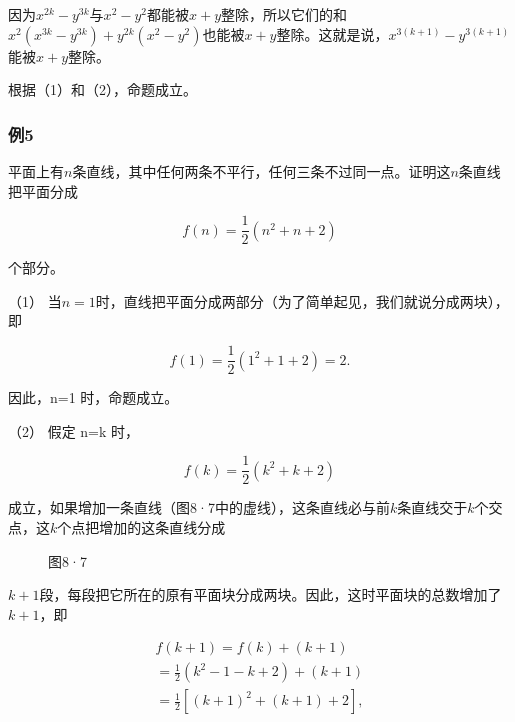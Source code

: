 因为\(x^{2k} - y^{3k}\)与\(x^2 - y^2\)都能被\(x + y\)整除，所以它们的和\(x^2(x^{3k} - y^{3k}) + y^{2k}(x^2 - y^2)\)也能被\(x + y\)整除。这就是说，\(x^{3(k + 1)} - y^{3(k + 1)}\)能被\(x + y\)整除。

根据（1）和（2），命题成立。

\subsubsection{例5}

平面上有\(n\)条直线，其中任何两条不平行，任何三条不过同一点。证明这\(n\)条直线把平面分成

\[
f (n) = \frac{1}{2} (n^{2} + n + 2)
\]

个部分。

 （1）
当\(n = 1\)时，直线把平面分成两部分（为了简单起见，我们就说分成两块），即

\[
f (1) = \frac{1}{2} (1^{2} + 1 + 2) = 2.
\]

因此，n=1 时，命题成立。

（2） 假定 n=k 时，

\[
f (k) = \frac{1}{2} (k^{2} + k + 2)
\]

成立，如果增加一条直线（图8·7中的虚线），这条直线必与前\(k\)条直线交于\(k\)个交点，这\(k\)个点把增加的这条直线分成

\begin{figure}
\centering
\caption{图8·7}
\end{figure}


\(k + 1\)段，每段把它所在的原有平面块分成两块。因此，这时平面块的总数增加了\(k + 1\)，即

\[
\begin{array}{l} f (k + 1) = f (k) + (k + 1) \\ = \frac{1}{2} \left(k^{2} - 1 - k + 2\right) + (k + 1) \\ = \frac{1}{2} [ (k + 1)^{2} + (k + 1) + 2 ], \\ \end{array}
\]

